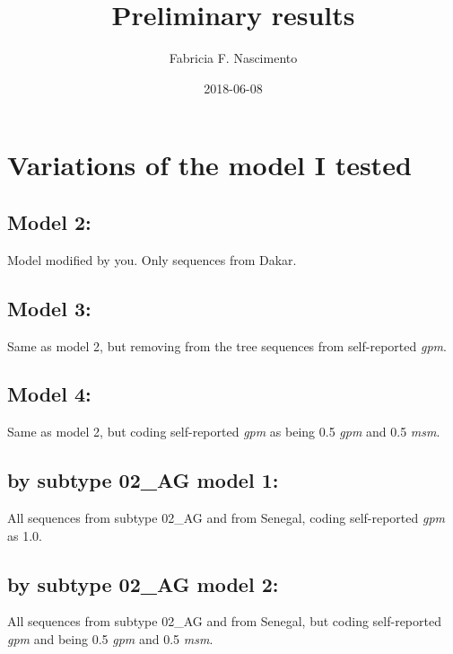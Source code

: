 \documentclass[12pt,]{article}
\title{Preliminary results}
\author{Fabricia F. Nascimento}
\date{2018-06-08}
\begin{document}
\maketitle

\hypertarget{variations-of-the-model-i-tested}{%
\section{Variations of the model I
tested}\label{variations-of-the-model-i-tested}}

\hypertarget{model-2}{%
\subsection{Model 2:}\label{model-2}}

Model modified by you. Only sequences from Dakar.

\hypertarget{model-3}{%
\subsection{Model 3:}\label{model-3}}

Same as model 2, but removing from the tree sequences from self-reported
\emph{gpm}.

\hypertarget{model-4}{%
\subsection{Model 4:}\label{model-4}}

Same as model 2, but coding self-reported \emph{gpm} as being 0.5
\emph{gpm} and 0.5 \emph{msm}.

\hypertarget{by-subtype-02_ag-model-1}{%
\subsection{by subtype 02\_AG model 1:}\label{by-subtype-02_ag-model-1}}

All sequences from subtype 02\_AG and from Senegal, coding self-reported
\emph{gpm} as 1.0.

\hypertarget{by-subtype-02_ag-model-2}{%
\subsection{by subtype 02\_AG model 2:}\label{by-subtype-02_ag-model-2}}

All sequences from subtype 02\_AG and from Senegal, but coding
self-reported \emph{gpm} and being 0.5 \emph{gpm} and 0.5 \emph{msm}.
\end{document}

